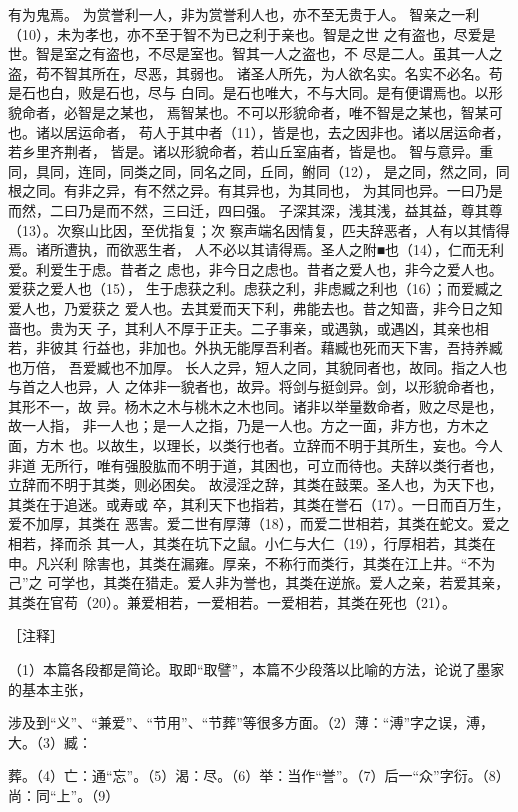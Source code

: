 \documentclass[12pt,UTF8]{ctexbook}
\begin{document}
有为鬼焉。 
为赏誉利一人，非为赏誉利人也，亦不至无贵于人。 
智亲之一利（10），未为孝也，亦不至于智不为已之利于亲也。智是之世 
之有盗也，尽爱是世。智是室之有盗也，不尽是室也。智其一人之盗也，不 
尽是二人。虽其一人之盗，苟不智其所在，尽恶，其弱也。 
诸圣人所先，为人欲名实。名实不必名。苟是石也白，败是石也，尽与 
白同。是石也唯大，不与大同。是有便谓焉也。以形貌命者，必智是之某也， 
焉智某也。不可以形貌命者，唯不智是之某也，智某可也。诸以居运命者， 
苟人于其中者（11），皆是也，去之因非也。诸以居运命者，若乡里齐荆者， 
皆是。诸以形貌命者，若山丘室庙者，皆是也。 
智与意异。重同，具同，连同，同类之同，同名之同，丘同，鲋同（12）， 
是之同，然之同，同根之同。有非之异，有不然之异。有其异也，为其同也， 
为其同也异。一曰乃是而然，二曰乃是而不然，三曰迁，四曰强。 
子深其深，浅其浅，益其益，尊其尊（13）。次察山比因，至优指复；次 
察声端名因情复，匹夫辞恶者，人有以其情得焉。诸所遭执，而欲恶生者， 
人不必以其请得焉。圣人之附■也（14），仁而无利爱。利爱生于虑。昔者之 
虑也，非今日之虑也。昔者之爱人也，非今之爱人也。爱获之爱人也（15）， 
生于虑获之利。虑获之利，非虑臧之利也（16）；而爱臧之爱人也，乃爱获之 
爱人也。去其爱而天下利，弗能去也。昔之知啬，非今日之知啬也。贵为天 
子，其利人不厚于正夫。二子事亲，或遇孰，或遇凶，其亲也相若，非彼其 
行益也，非加也。外执无能厚吾利者。藉臧也死而天下害，吾持养臧也万倍， 
吾爱臧也不加厚。 
长人之异，短人之同，其貌同者也，故同。指之人也与首之人也异，人 
之体非一貌者也，故异。将剑与挺剑异。剑，以形貌命者也，其形不一，故 
异。杨木之木与桃木之木也同。诸非以举量数命者，败之尽是也，故一人指， 
非一人也；是一人之指，乃是一人也。方之一面，非方也，方木之面，方木 
也。以故生，以理长，以类行也者。立辞而不明于其所生，妄也。今人非道 
无所行，唯有强股肱而不明于道，其困也，可立而待也。夫辞以类行者也， 
立辞而不明于其类，则必困矣。 
故浸淫之辞，其类在鼓栗。圣人也，为天下也，其类在于追迷。或寿或 
卒，其利天下也指若，其类在誉石（17）。一日而百万生，爱不加厚，其类在 
恶害。爱二世有厚薄（18），而爱二世相若，其类在蛇文。爱之相若，择而杀 
其一人，其类在坑下之鼠。小仁与大仁（19），行厚相若，其类在申。凡兴利 
除害也，其类在漏雍。厚亲，不称行而类行，其类在江上井。“不为己”之 
可学也，其类在猎走。爱人非为誉也，其类在逆旅。爱人之亲，若爱其亲， 
其类在官苟（20）。兼爱相若，一爱相若。一爱相若，其类在死也（21）。 


［注释］ 

（1）本篇各段都是简论。取即“取譬”，本篇不少段落以比喻的方法，论说了墨家的基本主张， 

涉及到“义”、“兼爱”、“节用”、“节葬”等很多方面。（2）薄：“溥”字之误，溥，大。（3）臧： 

葬。（4）亡：通“忘”。（5）渴：尽。（6）举：当作“誉”。（7）后一“众”字衍。（8）尚：同“上”。（9） 
\end{document}
